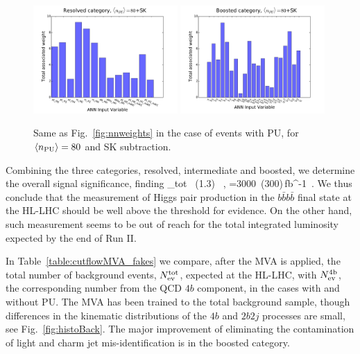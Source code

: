 \begin{figure}[t]
\begin{center}
\includegraphics[width=0.49\textwidth]{plots/res_wgthist_SKPU80.pdf}
\includegraphics[width=0.49\textwidth]{plots/bst_wgthist_SKPU80.pdf}
\vspace{-0.5cm}
\caption{\small
Same as Fig.~\ref{fig:nnweights} in the
case of events with PU, for
 $\left\langle n_{\rm PU}\right\rangle=80$ 
  and SK subtraction.
}
\label{fig:nnweights_PU}
\end{center}
\end{figure}




Combining the three categories, resolved,
intermediate and boosted, we determine the overall signal
significance, finding
\be
\lp {}\rp_{\rm tot} ~(1.3) \, ,\quad
{}=3000~(300)\,{\rm fb}^{-1}\, .
\ee
%
We thus conclude that the measurement of
Higgs pair production in the $b\bar{b}b\bar{b}$ final state at the HL-LHC
should be 
well above the threshold for evidence.
%
On the other hand, such measurement seems to be out of reach
for the total integrated luminosity expected by the end of Run II.

In Table~\ref{table:cutflowMVA_fakes} we compare,
after the MVA is applied,
the total
number of background events, $N_{\rm ev}^{\rm tot}$,
    expected at the HL-LHC, with
     $N_{\rm ev}^{\rm 4b}$, the corresponding number
    from the QCD $4b$ component, in the cases with and without
    PU.
    The MVA has been trained to the total background sample,
    though differences
    in the kinematic distributions of the $4b$ and $2b2j$ processes are small,
    see Fig.~\ref{fig:histoBack}.
    The major improvement of eliminating the contamination
    of light and charm jet mis-identification is in the boosted category.

